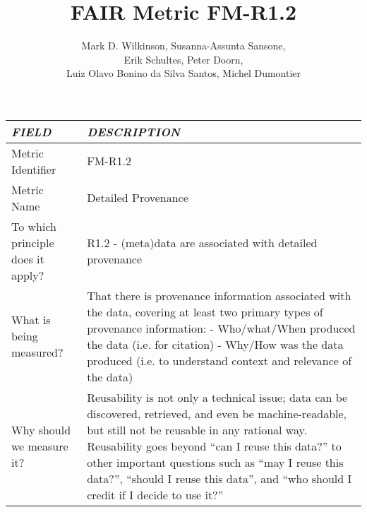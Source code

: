 \documentclass[english]{article}
\begin{document}
\title{FAIR Metric FM-R1.2}

\author{Mark D. Wilkinson, Susanna-Assunta Sansone, \\Erik Schultes, Peter Doorn,\\ 
Luiz Olavo Bonino da Silva Santos, Michel Dumontier}

\maketitle

\newpage





\begin{longtable}{|p{5cm}|p{9cm}|}


\hline
\emph{FIELD} & \emph{DESCRIPTION} \\
\hline
Metric Identifier &   FM-R1.2
\\


\hline
Metric Name &   


Detailed Provenance


 \\



\hline
To which principle does it apply? &   


R1.2 - (meta)data are associated with detailed provenance

\\



\hline
What is being measured? & 


That there is provenance information associated with the data, covering at least two primary types of provenance information:\newline 
\newline 
- Who/what/When produced the data (i.e. for citation)\newline 
- Why/How was the data produced (i.e. to understand context and relevance of the data)

\\



\hline
Why should we measure it? & 


Reusability is not only a technical issue; data can be discovered, retrieved, and even be machine-readable, but still not be reusable in any rational way.  Reusability goes beyond “can I reuse this data?” to other important questions such as “may I reuse this data?”, “should I reuse this data”, and “who should I credit if I decide to use it?”



\end{longtable}
\end{document}
